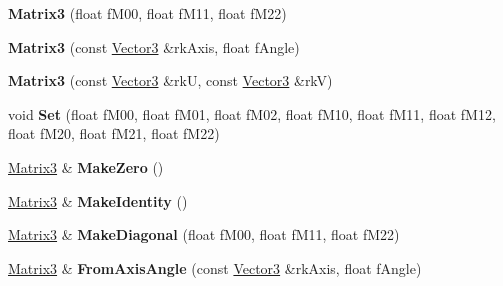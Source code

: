 \begin{DoxyCompactItemize}
\item 
{\bfseries Matrix3} (float f\+M00, float f\+M11, float f\+M22)\hypertarget{class_i_dream_sky_1_1_matrix3_a1745b54a2306890d383102b6623fbfdc}{}\label{class_i_dream_sky_1_1_matrix3_a1745b54a2306890d383102b6623fbfdc}

\item 
{\bfseries Matrix3} (const \hyperlink{class_i_dream_sky_1_1_vector3}{Vector3} \&rk\+Axis, float f\+Angle)\hypertarget{class_i_dream_sky_1_1_matrix3_a6fa87cbf87c6f74ca563d660feabb69b}{}\label{class_i_dream_sky_1_1_matrix3_a6fa87cbf87c6f74ca563d660feabb69b}

\item 
{\bfseries Matrix3} (const \hyperlink{class_i_dream_sky_1_1_vector3}{Vector3} \&rkU, const \hyperlink{class_i_dream_sky_1_1_vector3}{Vector3} \&rkV)\hypertarget{class_i_dream_sky_1_1_matrix3_a4d8193b43b5c7133f5c0d42037f16114}{}\label{class_i_dream_sky_1_1_matrix3_a4d8193b43b5c7133f5c0d42037f16114}

\item 
void {\bfseries Set} (float f\+M00, float f\+M01, float f\+M02, float f\+M10, float f\+M11, float f\+M12, float f\+M20, float f\+M21, float f\+M22)\hypertarget{class_i_dream_sky_1_1_matrix3_a4283ec56bbd2a02973273964089ee3ef}{}\label{class_i_dream_sky_1_1_matrix3_a4283ec56bbd2a02973273964089ee3ef}

\item 
\hyperlink{class_i_dream_sky_1_1_matrix3}{Matrix3} \& {\bfseries Make\+Zero} ()\hypertarget{class_i_dream_sky_1_1_matrix3_abe42a37c1c5eccca39510752401f0b8f}{}\label{class_i_dream_sky_1_1_matrix3_abe42a37c1c5eccca39510752401f0b8f}

\item 
\hyperlink{class_i_dream_sky_1_1_matrix3}{Matrix3} \& {\bfseries Make\+Identity} ()\hypertarget{class_i_dream_sky_1_1_matrix3_ab4c1e3d6f864fa5c3df4db6be0d1cb63}{}\label{class_i_dream_sky_1_1_matrix3_ab4c1e3d6f864fa5c3df4db6be0d1cb63}

\item 
\hyperlink{class_i_dream_sky_1_1_matrix3}{Matrix3} \& {\bfseries Make\+Diagonal} (float f\+M00, float f\+M11, float f\+M22)\hypertarget{class_i_dream_sky_1_1_matrix3_ab60e755c97ed19f2f59fdddb858976da}{}\label{class_i_dream_sky_1_1_matrix3_ab60e755c97ed19f2f59fdddb858976da}

\item 
\hyperlink{class_i_dream_sky_1_1_matrix3}{Matrix3} \& {\bfseries From\+Axis\+Angle} (const \hyperlink{class_i_dream_sky_1_1_vector3}{Vector3} \&rk\+Axis, float f\+Angle)\hypertarget{class_i_dream_sky_1_1_matrix3_a5198d2623abd8a096ff0f7b322df48f7}{}\label{class_i_dream_sky_1_1_matrix3_a5198d2623abd8a096ff0f7b322df48f7}


\end{DoxyCompactItemize}
